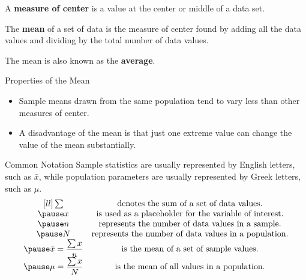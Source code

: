 \documentclass{beamer}
\begin{document}
\begin{frame}
\begin{definition}
A \textbf{measure of center} is a value at the center or middle of a data set.
\end{definition}\pause

\begin{definition}
The \textbf{mean} of a set of data is the measure of center found by adding all the data values and dividing by the total number of data values.
\end{definition}\pause

\begin{note}
The mean is also known as the \textbf{average}.
\end{note}\pause

\begin{block}{Properties of the Mean}
\begin{itemize}
\item Sample means drawn from the same population tend to vary less than other measures of center.\pause
\item A disadvantage of the mean is that just one extreme value can change the value of the mean substantially.
\end{itemize}
\end{block}
\end{frame}

\begin{frame}
\begin{block}{Common Notation}
Sample statistics are usually represented by English letters, such as $\bar{x}$, while population parameters are usually represented by Greek letters, such as $\mu$.\pause
\vspace{-4mm}
{\renewcommand*{\arraystretch}{2.2}
\begin{equation*}
\begin{matrix}[ll]
\sum & \text{denotes the sum of a set of data values.} \\\pause
x & \text{is used as a placeholder for the variable of interest.} \\\pause
n & \text{represents the number of data values in a sample.} \\\pause
N & \text{represents the number of data values in a population.} \\\pause
\bar{x}=\dfrac{\sum x}{n} & \text{is the mean of a set of sample values.} \\\pause
\mu = \dfrac{\sum x}{N} & \text{is the mean of all values in a population.}
\end{matrix}
\end{equation*}}
\end{block}
\end{frame}
\end{document}
